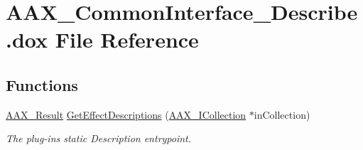 \hypertarget{a00185}{}\section{A\+A\+X\+\_\+\+Common\+Interface\+\_\+\+Describe.\+dox File Reference}
\label{a00185}
\subsection*{Functions}
\begin{DoxyCompactItemize}
\item 
\hyperlink{a00149_a4d8f69a697df7f70c3a8e9b8ee130d2f}{A\+A\+X\+\_\+\+Result} \hyperlink{a00326_gae0d356eef326f77cbb972e48946d4892}{Get\+Effect\+Descriptions} (\hyperlink{a00087}{A\+A\+X\+\_\+\+I\+Collection} $\ast$in\+Collection)
\begin{DoxyCompactList}\small\item\em The plug-\/in\textquotesingle{}s static Description entrypoint. \end{DoxyCompactList}\end{DoxyCompactItemize}
